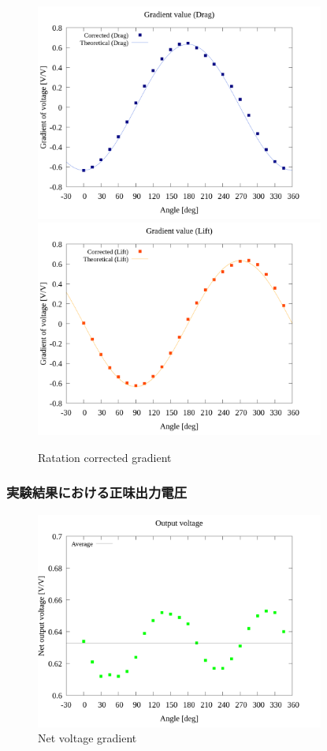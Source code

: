 \begin{figure}[htbp]
  \begin{center}
    \includegraphics[width=95mm]{../../02_workspace/result/2-ex/plot/21/21-4_corrected_angle_drag.png}
    \includegraphics[width=95mm]{../../02_workspace/result/2-ex/plot/21/21-4_corrected_angle_lift.png}
  \end{center}
  \caption{Ratation corrected gradient}
\end{figure}

\newpage

\subsubsection{実験結果における正味出力電圧}

\begin{figure}[htbp]
  \centering
  \includegraphics[width=95mm]{../../02_workspace/result/2-ex/plot/09/09_summary-outputvoltage-net.png}
  \caption{Net voltage gradient}
\end{figure}

